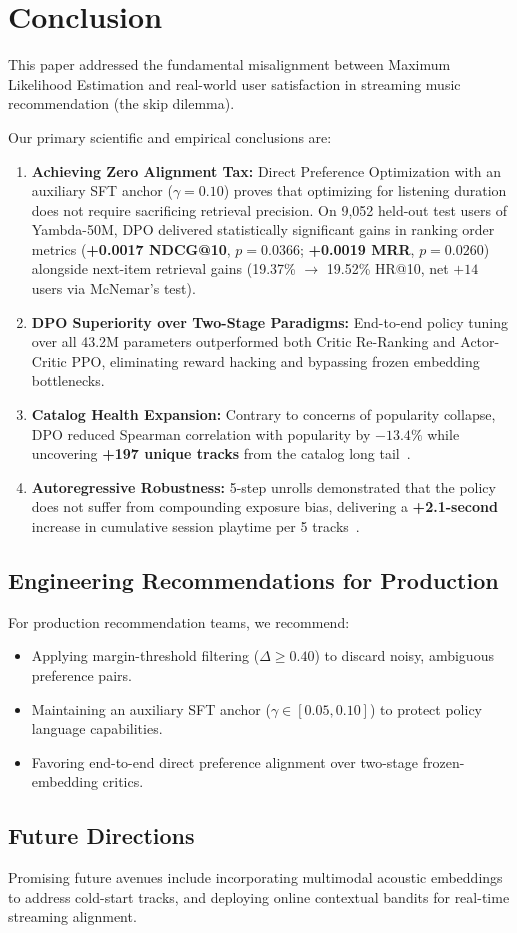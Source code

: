 \section{Conclusion}
\label{sec:conclusion}

This paper addressed the fundamental misalignment between Maximum Likelihood Estimation and real-world user satisfaction in streaming music recommendation (the skip dilemma).

Our primary scientific and empirical conclusions are:
\begin{enumerate}
    \item \textbf{Achieving Zero Alignment Tax:} Direct Preference Optimization with an auxiliary SFT anchor ($\gamma=0.10$) proves that optimizing for listening duration does not require sacrificing retrieval precision. On 9,052 held-out test users of Yambda-50M, DPO delivered statistically significant gains in ranking order metrics (\textbf{+0.0017 NDCG@10}, $p = 0.0366$; \textbf{+0.0019 MRR}, $p = 0.0260$) alongside next-item retrieval gains (19.37\% $\to$ 19.52\% HR@10, net $+14$ users via McNemar's test).
    \item \textbf{DPO Superiority over Two-Stage Paradigms:} End-to-end policy tuning over all 43.2M parameters outperformed both Critic Re-Ranking and Actor-Critic PPO, eliminating reward hacking and bypassing frozen embedding bottlenecks.
    \item \textbf{Catalog Health Expansion:} Contrary to concerns of popularity collapse, DPO reduced Spearman correlation with popularity by \textbf{$-13.4\%$} while uncovering \textbf{+197 unique tracks} from the catalog long tail~\cite{petrov2024aligning}.
    \item \textbf{Autoregressive Robustness:} 5-step unrolls demonstrated that the policy does not suffer from compounding exposure bias, delivering a \textbf{+2.1-second} increase in cumulative session playtime per 5 tracks~\cite{matveev2026session}.
\end{enumerate}

\subsection{Engineering Recommendations for Production}
For production recommendation teams, we recommend:
\begin{itemize}
    \item Applying margin-threshold filtering ($\Delta \ge 0.40$) to discard noisy, ambiguous preference pairs.
    \item Maintaining an auxiliary SFT anchor ($\gamma \in [0.05, 0.10]$) to protect policy language capabilities.
    \item Favoring end-to-end direct preference alignment over two-stage frozen-embedding critics.
\end{itemize}

\subsection{Future Directions}
Promising future avenues include incorporating multimodal acoustic embeddings to address cold-start tracks, and deploying online contextual bandits for real-time streaming alignment.
